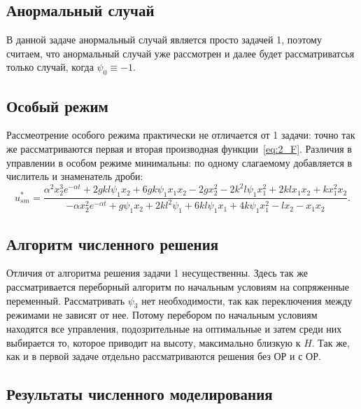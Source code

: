 \documentclass[12pt, a4paper]{article} %
\begin{document}
\subsection{Анормальный случай}
В данной задаче анормальный случай является просто задачей 1, 
поэтому считаем, что анормальный случай уже рассмотрен и далее будет 
рассматриватсья только случай, когда $\psi_0 \equiv -1$.

\subsection{Особый режим}
Рассмеотрение особого режима практически не отличается от 1 задачи:
точно так же рассматриваются первая и вторая производная функции~\eqref{eq:2_F}.
Различия в управлении в особом режиме минимальны: по одному слагаемому добавляется в числитель и знаменатель дроби:
\begin{equation}
    u^*_{sm} =  \frac{\alpha^2 x_2^3 e^{-\alpha t} + 2 g k l \psi_{1} x_{2} + 6 g k \psi_{1} x_{1} x_{2} - 2 g x_{2}^{2} - 2 k^{2} l \psi_{1} x_{1}^{2} + 2 k l x_{1} x_{2} + k x_{1}^{2} x_{2}}{-\alpha x_2^2 e^{-\alpha t} + g \psi_{1} x_{2} + 2 k l^{2} \psi_{1} + 6 k l \psi_{1} x_{1} + 4 k \psi_{1} x_{1}^{2} - l x_{2} - x_{1} x_{2}}
.\end{equation} 

\subsection{Алгоритм численного решения}

Отличия от алгоритма решения задачи 1 несущественны.
Здесь так же рассматривается переборный алгоритм по начальным условиям на сопряженные переменный.
Рассматривать $\psi_3$ нет необходимости, так как переключения между режимами не зависят от нее. 
Потому перебором по начальным условиям находятся все управления, подозрительные на оптимальные и затем среди них выбирается то, которое приводит на высоту, максимально близкую к $H$.
Так же, как и в первой задаче отдельно рассматриваются решения без ОР и с ОР.

\subsection{Результаты численного моделирования}
\end{document}
